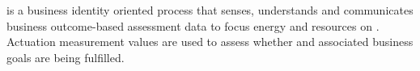 %
%
\textbf{} is a business identity oriented
process that senses, understands and communicates business outcome-based assessment data to focus energy and
resources on .
Actuation measurement values are used to assess whether 
and associated business goals are being fulfilled.